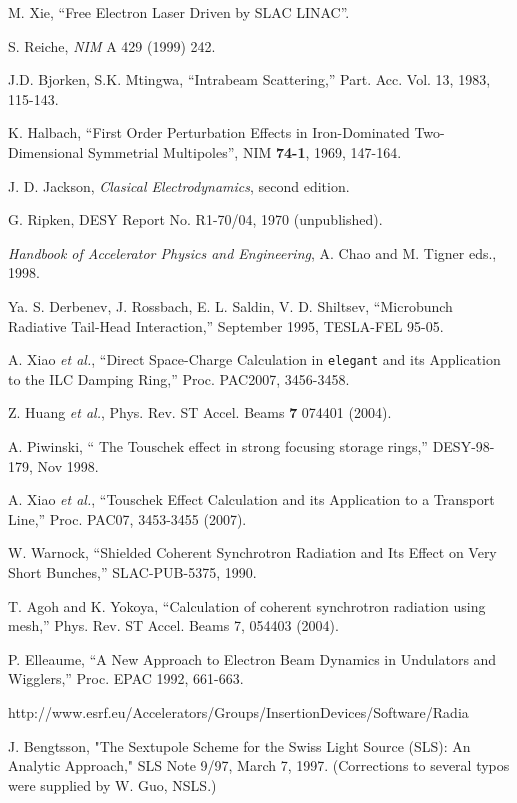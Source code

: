 \documentclass[11pt]{article}
\begin{document}
\begin{thebibliography}{9}
 M. Xie, ``Free Electron Laser Driven by SLAC
LINAC''.

 S. Reiche, {\em NIM} A 429 (1999) 242.

  J.D. Bjorken, S.K. Mtingwa, ``Intrabeam Scattering,'' Part. Acc. Vol. 13, 
  1983, 115-143.

    K. Halbach, ``First Order Perturbation Effects in Iron-Dominated Two-Dimensional Symmetrial Multipoles'',
    NIM {\bf 74-1}, 1969, 147-164.

  J. D. Jackson, {\em Clasical Electrodynamics}, second edition.

 G. Ripken, DESY Report No. R1-70/04, 1970 (unpublished).

  {\em Handbook of Accelerator Physics and Engineering}, A. Chao and M. Tigner eds., 1998.

  Ya. S. Derbenev, J. Rossbach, E. L. Saldin, V. D. Shiltsev, ``Microbunch Radiative Tail-Head
  Interaction,'' September 1995, TESLA-FEL 95-05.

  A. Xiao {\em et al.}, ``Direct Space-Charge Calculation in {\tt elegant} and its Application to the
 ILC Damping Ring,'' Proc. PAC2007, 3456-3458.

  Z. Huang {\em et al.}, Phys. Rev. ST Accel. Beams {\bf 7} 074401 (2004).

  A. Piwinski, `` The Touschek effect in strong focusing storage rings,'' DESY-98-179, Nov 1998.

  A. Xiao {\em et al.}, ``Touschek Effect Calculation and its Application to a Transport Line,''
  Proc. PAC07, 3453-3455 (2007).

  W. Warnock, ``Shielded Coherent Synchrotron Radiation and Its Effect on Very Short Bunches,'' SLAC-PUB-5375, 1990.

  T. Agoh and K. Yokoya, ``Calculation of coherent synchrotron radiation using mesh,'' Phys. Rev. ST Accel. Beams 7,
  054403 (2004).

  P. Elleaume, ``A New Approach to Electron Beam Dynamics in Undulators and Wigglers,'' Proc. EPAC 1992, 661-663.

  http://www.esrf.eu/Accelerators/Groups/InsertionDevices/Software/Radia

 J. Bengtsson, "The Sextupole Scheme for the Swiss Light Source (SLS): An Analytic Approach," SLS Note 9/97,
 March 7, 1997. (Corrections to several typos were supplied by W. Guo, NSLS.)


\end{thebibliography}
\end{document}
